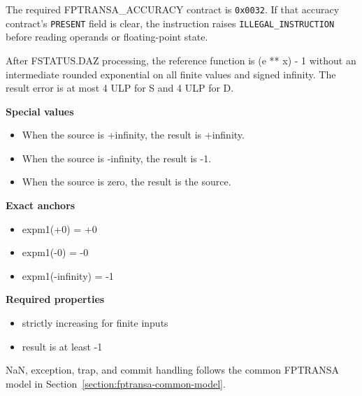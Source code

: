 The required FPTRANSA\_ACCURACY contract is \texttt{0x0032}. If that accuracy contract's \texttt{PRESENT} field is clear, the instruction raises \texttt{ILLEGAL\_INSTRUCTION} before reading operands or floating-point state.

After FSTATUS.DAZ processing, the reference function is (e ** x) - 1 without an intermediate rounded exponential on all finite values and signed infinity. The result error is at most 4 ULP for S and 4 ULP for D.

\textbf{Special values}\par
\begin{itemize}
\item When the source is +infinity, the result is +infinity.
\item When the source is -infinity, the result is -1.
\item When the source is zero, the result is the source.
\end{itemize}

\textbf{Exact anchors}\par
\begin{itemize}
\item expm1(+0) = +0
\item expm1(-0) = -0
\item expm1(-infinity) = -1
\end{itemize}

\textbf{Required properties}\par
\begin{itemize}
\item strictly increasing for finite inputs
\item result is at least -1
\end{itemize}

NaN, exception, trap, and commit handling follows the common FPTRANSA model in Section~\ref{section:fptransa-common-model}.
